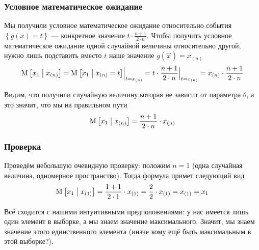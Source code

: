 \subsubsection{Условное математическое ожидание}
Мы получили условное математическое ожидание относительно события
$\left\{ g\left( x \right) = t \right\}$ --- конкретное значение
$t \cdot \frac{n+1}{2 \cdot n}$.
Чтобы получить условное математическое ожидание одной случайной величины
относительно другой, нужно лишь подставить вместо $t$
наше значение $g\left( \vec{x} \right) = x_{\left( n \right)}$
$$\operatorname{M}_{} \left[ x_1 \;\middle|\; x_{\left( n \right)} \right]
  = \Bigl. \operatorname{M}_{} \left[ x_1 \;\middle|\; x_{\left( n \right)} = t \right]
      \Bigr|_{t = x_{\left( n \right)}}
  = \Bigl. t \cdot \frac{n+1}{2 \cdot n} \Bigr|_{t = x_{\left( n \right)}}
  = x_{\left( n \right)} \cdot \frac{n+1}{2 \cdot n}$$

Видим, что получили случайную величину,которая не зависит от параметра
$\theta$, а это значит, что мы на правильном пути
$$\operatorname{M}_{} \left[ x_1 \;\middle|\; x_{\left( n \right)} \right]
  = \frac{n+1}{2 \cdot n} \cdot x_{\left( n \right)}$$

\subsubsection{Проверка}
Проведём небольшую очевидную проверку: положим $n=1$ (одна случайная величина,
одномерное пространство). Тогда формула примет следующий вид
$$\operatorname{M}_{} \left[ x_1 \;\middle|\; x_{\left( 1 \right)} \right]
  = \frac{1+1}{2 \cdot 1} \cdot x_{\left( 1 \right)}
  = \frac{2}{2} \cdot x_{\left( 1 \right)}
  = x_{\left( 1 \right)} = x_1$$

Всё сходится с нашими интуитивными предположениями: у нас имеется лишь один
элемент в выборке, а мы знаем значение максимального. Значит, мы знаем
значение этого единственного элемента (иначе кому ещё быть максимальным
в этой выборке?).
